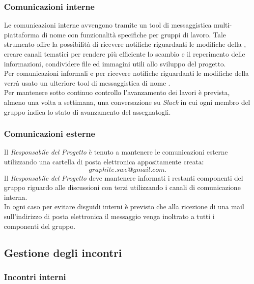 \documentclass[./../NomeDocumento.tex]{subfiles}
\begin{document}
	\subsubsection{Comunicazioni interne}
	
	Le comunicazioni interne avvengono tramite un tool di messaggistica multi-piattaforma di nome  con funzionalità specifiche per gruppi di lavoro. Tale strumento offre la possibilità di ricevere notifiche riguardanti le modifiche della  , creare canali tematici per rendere più efficiente lo scambio e il reperimento delle informazioni, condividere file ed immagini utili allo sviluppo del progetto.
	\\ \noindent Per comunicazioni informali e per ricevere notifiche riguardanti le modifiche della   verrà usato un ulteriore tool di messaggistica di nome .
	\\ \noindent Per mantenere sotto continuo controllo l'avanzamento dei lavori è prevista, almeno una volta a settimana, una conversazione su \textit{Slack} in cui ogni membro del gruppo indica lo stato di avanzamento del  assegnatogli.
	
	\subsubsection{Comunicazioni esterne}
	
	Il \textit{Responsabile del Progetto} è tenuto a mantenere le comunicazioni esterne utilizzando una cartella di posta elettronica appositamente creata:
		\[graphite.swe@gmail.com.\]
	Il \textit{Responsabile del Progetto} deve mantenere informati i restanti componenti del gruppo riguardo alle discussioni con terzi utilizzando i canali di comunicazione interna. 
	\\ \noindent In ogni caso per evitare disguidi interni è previsto che alla ricezione di una mail sull'indirizzo di posta elettronica il messaggio venga inoltrato a tutti i componenti del gruppo.
	
	\subsection{Gestione degli incontri}
	
	\subsubsection{Incontri interni}
	
\end{document}
